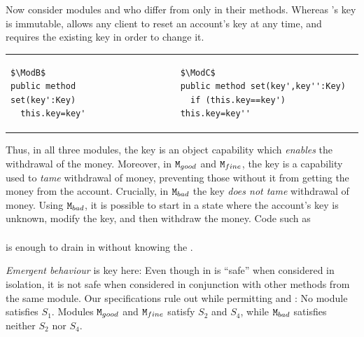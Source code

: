 \begin{example}
Now consider  modules \ModB and \ModC who differ from \ModA only in their  methods. Whereas \ModA 's key is immutable, \ModB allows any client to reset an account's key at any time, and \ModC requires the existing key in order to change it.
  

\begin{tabular}{lll}
\begin{minipage}[b]{0.40\textwidth}

\begin{lstlisting}[mathescape=true, language=Chainmail, frame=lines]
$\ModB$
public method set(key':Key)
  this.key=key'
\end{lstlisting}
\end{minipage}
&\ \ \  \ \   &%
\begin{minipage}[b]{0.48\textwidth}
\begin{lstlisting}[mathescape=true, language=chainmail, frame=lines]
$\ModC$
public method set(key',key'':Key)
  if (this.key==key')  this.key=key''
\end{lstlisting}
\end{minipage} 
\end{tabular}

{Thus, in all three modules, the key is an object capability which \emph{enables} the withdrawal of the money. 
Moreover, in $\mbox{\normalfont{\texttt{M}}}_{{good}}$ and $\mbox{\normalfont{\texttt{M}}}_{{fine}}$, the key
{is a capability} used to  \emph{tame} withdrawal of money, preventing those without it from getting the money from the account.}
Crucially,  in $\mbox{\normalfont{\texttt{M}}}_{{bad}}$ the key \emph{does not tame} withdrawal of money.
Using $\mbox{\normalfont{\texttt{M}}}_{{bad}}$, it is possible to start in a state where the account's key is unknown, modify the key, and then withdraw the money. 
Code  {such as}
\\ 
$\ \strut \hspace{.2in} $  
\\ 
is enough to drain   in \ModB without knowing the \password.
 
 \emph{Emergent behaviour} is key here: 
Even though %
 in  \ModB is ``safe'' when considered in isolation, it is not safe when considered in conjunction with other methods from the same module. 
Our  specifications  rule  out \ModB while permitting \ModA and
\ModC:
No module  satisfies $S_1$. Modules $\mbox{\normalfont{\texttt{M}}}_{{good}}$ and $\mbox{\normalfont{\texttt{M}}}_{{fine}}$ satisfy $S_2$ and $S_4$, while $\mbox{\normalfont{\texttt{M}}}_{{bad}}$ satisfies neither $S_2$ nor $S_4$.
\end{example}
 
